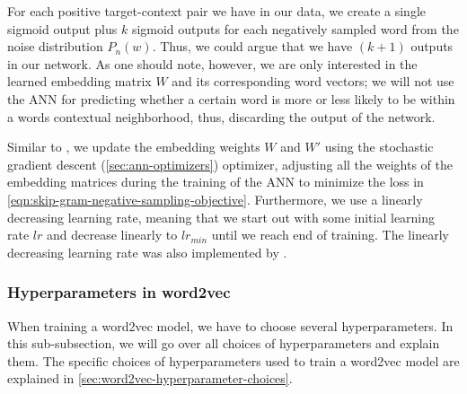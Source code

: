 For each positive target-context pair we have in our data, we create a single sigmoid output plus $k$ sigmoid outputs for each negatively sampled word from the noise distribution $P_n(w)$. Thus, we could argue that we have $(k + 1)$ outputs in our network. As one should note, however, we are only interested in the learned embedding matrix $W$ and its corresponding word vectors; we will not use the ANN for predicting whether a certain word is more or less likely to be within a words contextual neighborhood, thus, discarding the output of the network.

Similar to \cite{mikolov2013a}, we update the embedding weights $W$ and $W'$ using the stochastic gradient descent (\cref{sec:ann-optimizers}) optimizer, adjusting all the weights of the embedding matrices during the training of the ANN to minimize the loss in \cref{eqn:skip-gram-negative-sampling-objective}. Furthermore, we use a linearly decreasing learning rate, meaning that we start out with some initial learning rate $lr$ and decrease linearly to $lr_{min}$ until we reach end of training. The linearly decreasing learning rate was also implemented by \cite{mikolov2013a}.

\subsubsection{Hyperparameters in word2vec}
When training a word2vec model, we have to choose several hyperparameters. In this sub-subsection, we will go over all choices of hyperparameters and explain them. The specific choices of hyperparameters used to train a word2vec model are explained in \cref{sec:word2vec-hyperparameter-choices}.

